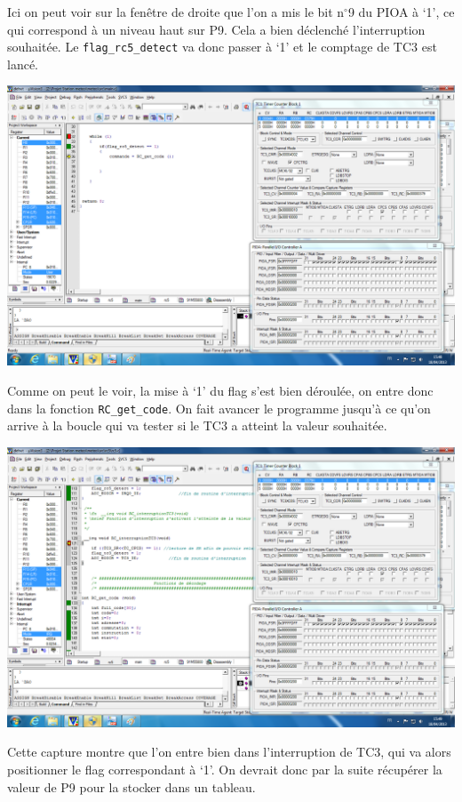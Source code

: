 \documentclass[a4paper]{report}
\begin{document}
Ici on peut voir sur la fenêtre de droite que l’on a mis le bit n$^\circ$9 du PIOA à ‘1’, ce qui correspond à un niveau haut sur P9.
Cela a bien déclenché l’interruption souhaitée.
Le \texttt{flag\_rc5\_detect} va donc passer à ‘1’ et le comptage de TC3 est lancé.

\begin{center}
	\includegraphics[scale=0.3]{images/RC_simu3.png}
\end{center}

Comme on peut le voir, la mise à ‘1’ du flag s’est bien déroulée, on entre donc dans la fonction \texttt{RC\_get\_code}.
On fait avancer le programme jusqu’à ce qu’on arrive à la boucle qui va tester si le TC3 a atteint la valeur souhaitée.

\begin{center}
	\includegraphics[scale=0.3]{images/RC_simu4.png}
\end{center}

Cette capture montre que l’on entre bien dans l’interruption de TC3, qui va alors positionner le flag correspondant à ‘1’.
On devrait donc par la suite récupérer la valeur de P9 pour la stocker dans un tableau.
\end{document}

